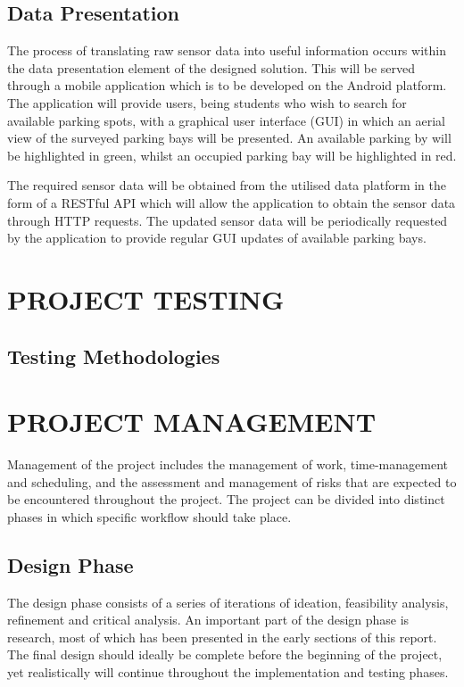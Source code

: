 \documentclass[10pt,twocolumn]{witseiepaper}
\begin{document}
	\subsection{Data Presentation}
		The process of translating raw sensor data into useful information occurs within the data presentation element of the designed solution. This will be served through a mobile application which is to be developed on the Android platform. The application will provide users, being students who wish to search for available parking spots, with a graphical user interface (GUI) in which an aerial view of the surveyed parking bays will be presented. An available parking by will be highlighted in green, whilst an occupied parking bay will be highlighted in red.

		The required sensor data will be obtained from the utilised data platform in the form of a RESTful API which will allow the application to obtain the sensor data through HTTP requests. The updated sensor data will be periodically requested by the application to provide regular GUI updates of available parking bays.
	
\section{PROJECT TESTING}
	\subsection{Testing Methodologies}


\section{PROJECT MANAGEMENT}

	Management of the project includes the management of work, time-management and scheduling, and the assessment and management of risks that are expected to be encountered throughout the project. The project can be divided into distinct phases in which specific workflow should take place.
	
	\subsection{Design Phase}
		The design phase consists of a series of iterations of ideation, feasibility analysis, refinement and critical analysis. An important part of the design phase is research, most of which has been presented in the early sections of this report. The final design should ideally be complete before the beginning of the project, yet realistically will continue throughout the implementation and testing phases. 
		
\end{document}
